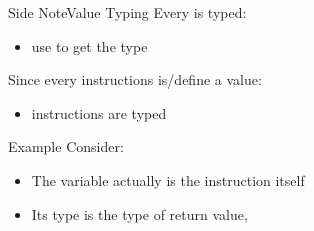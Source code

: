 \begin{frame}{Side Note}{Value Typing}
Every  is typed:

\begin{itemize}
\item use  to get the type
\end{itemize}

\vfill
Since every instructions is/define a value:

\begin{itemize}
\item instructions are typed
\end{itemize}

\vfill
\begin{block}{Example}
Consider:

\centering
{}

\flushleft
\begin{itemize}
\item The  variable actually is the instruction itself
\item Its type is the type of  return value, 
\end{itemize}
\end{block}
\end{frame}

